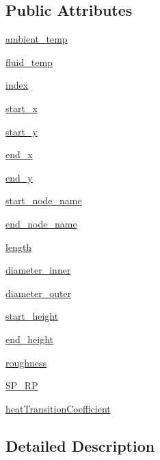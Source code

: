 \subsection*{Public Attributes}
\begin{DoxyCompactItemize}
\item 
\hyperlink{class_pipe_1_1_pipe_a721626d39e9fa569ff1bea20d43d6891}{ambient\+\_\+temp}
\item 
\hyperlink{class_pipe_1_1_pipe_a9ac4eaff0763b3dffd827858c02166bd}{fluid\+\_\+temp}
\item 
\hyperlink{class_pipe_1_1_pipe_a1fb5c94ac5e6dac7b415a170524a75f5}{index}
\item 
\hyperlink{class_pipe_1_1_pipe_a99b713a0d71ea921e5fdd7665a294598}{start\+\_\+x}
\item 
\hyperlink{class_pipe_1_1_pipe_a9104dacc2e9f3541a8171c7d7bbf8a2e}{start\+\_\+y}
\item 
\hyperlink{class_pipe_1_1_pipe_a3c89ac40d76fd166fb08ebb585ef220e}{end\+\_\+x}
\item 
\hyperlink{class_pipe_1_1_pipe_a8ea1c50334527d53a3c83b26f2c41dfa}{end\+\_\+y}
\item 
\hyperlink{class_pipe_1_1_pipe_ad604bcf622bea20a2e6089515e793700}{start\+\_\+node\+\_\+name}
\item 
\hyperlink{class_pipe_1_1_pipe_ae09a8821336f622e4215d22bdead0952}{end\+\_\+node\+\_\+name}
\item 
\hyperlink{class_pipe_1_1_pipe_aed39cdfd26dab2d8aa176fbcc8ee0eac}{length}
\item 
\hyperlink{class_pipe_1_1_pipe_a498f8ef080ca2ef5533d4bb239c02e84}{diameter\+\_\+inner}
\item 
\hyperlink{class_pipe_1_1_pipe_ad4a6c940a7986e70a34f4d7dc5659a19}{diameter\+\_\+outer}
\item 
\hyperlink{class_pipe_1_1_pipe_acdfc6a6bdd70105a3342553a03ad9277}{start\+\_\+height}
\item 
\hyperlink{class_pipe_1_1_pipe_a8c66a7b6c464b5c48d567c19be7e72ca}{end\+\_\+height}
\item 
\hyperlink{class_pipe_1_1_pipe_ae5cec5540b37294ed43fad9d9f187d4b}{roughness}
\item 
\hyperlink{class_pipe_1_1_pipe_a94e84282ca30ec24343eb219f67e783b}{S\+P\+\_\+\+RP}
\item 
\hyperlink{class_pipe_1_1_pipe_ad75af1651b56fe12e4cff8d1254afa98}{heat\+Transition\+Coefficient}
\end{DoxyCompactItemize}


\subsection{Detailed Description}


